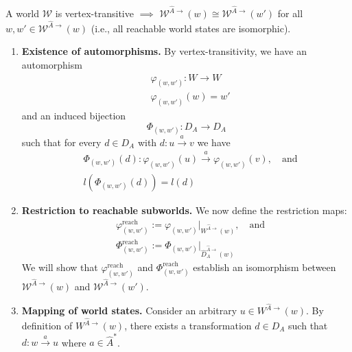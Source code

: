 \begin{propositionE}
    A world $\mathscr{W}$ is vertex-transitive $\implies$ $\mathscr{W}^{\hat{A}\to}(w) \cong \mathscr{W}^{\hat{A}\to}(w')$ for all $w, w' \in \mathscr{W}^{\hat{A}\to}(w)$ (i.e., all reachable world states are isomorphic).
\end{propositionE}
\begin{proofE}
\begin{enumerate}
    \item \textbf{Existence of automorphisms.}
    By vertex-transitivity, we have an automorphism
    \begin{equation}
    \begin{aligned}
        & \varphi_{(w,w')}: W \to W \\
        & \varphi_{(w,w')}(w) = w'
    \end{aligned}
    \end{equation}
    and an induced bijection
    \begin{equation}
        \Phi_{(w,w')}: D_{A} \to D_{A}
    \end{equation}
    such that for every $d \in D_{A}$ with $d: u \xrightarrow{a} v$ we have
    \begin{align}
        & \Phi_{(w,w')}(d): \varphi_{(w,w')}(u) \xrightarrow{a} \varphi_{(w,w')}(v), \quad \text{and} \\
        & l(\Phi_{(w,w')}(d)) = l(d)
    \end{align}

    \item \textbf{Restriction to reachable subworlds.}
    We now define the restriction maps:
    \begin{align}
        & \varphi^{\text{reach}}_{(w,w')} := \varphi_{(w,w')}|_{W^{\hat{A}\to}(w)}, \quad \text{and} \\
        & \Phi^{\text{reach}}_{(w,w')} := \Phi_{(w,w')}|_{\hat{D}_{A}^{\hat{A}\to}(w)}
    \end{align}
    We will show that $\varphi^{\text{reach}}_{(w,w')}$ and $\Phi^{\text{reach}}_{(w,w')}$ establish an isomorphism between $\mathscr{W}^{\hat{A}\to}(w)$ and $\mathscr{W}^{\hat{A}\to}(w')$.

    \item \textbf{Mapping of world states.}
    Consider an arbitrary $u \in W^{\hat{A}\to}(w)$.
    By definition of $W^{\hat{A}\to}(w)$, there exists a transformation $d \in D_{A}$ such that $d: w \xrightarrow{a} u$ where $a \in \hat{A}^{*}$.
    

\end{enumerate}
\end{proofE}
